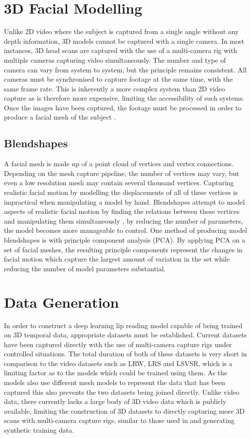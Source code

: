 \documentclass[12pt]{article}
\begin{document}
\section{3D Facial Modelling}
Unlike 2D video where the subject is captured from a single angle without any depth information, 3D models cannot be captured with a single camera.
In most instances, 3D head scans are captured with the use of a multi-camera rig with multiple cameras capturing video simultaneously.
The number and type of camera can vary from system to system, but the principle remains consistent.
All cameras must be synchronised to capture footage at the same time, with the same frame rate.
This is inherently a more complex system than 2D video capture as is therefore more expensive, limiting the accessibility of such systems.  
Once the images have been captured, the footage must be processed in order to produce a facial mesh of the subject \cite{Li2017}.

\subsection{Blendshapes}
A facial mesh is made up of a point cloud of vertices and vertex connections.
Depending on the mesh capture pipeline, the number of vertices may vary, but even a low resolution mesh may contain several thousand vertices.
Capturing realistic facial motion by modelling the displacements of all of these vertices is impractical when manipulating a model by hand.
Blendshapes attempt to model aspects of realistic facial motion by finding the relations between these vertices and manipulating them simultaneously \cite{Lewis2010}, by reducing the number of parameters, the model becomes more manageable to control.
One method of producing model blendshapes is with principle component analysis (PCA).
By applying PCA on a set of facial meshes, the resulting principle components represent the changes in facial motion which capture the largest amount of variation in the set while reducing the number of model parameters substantial.


\section{Data Generation}
In order to construct a deep learning lip reading model capable of being trained on 3D temporal data, appropriate datasets must be established.
Current datasets have been captured directly \cite{Tzirakis2019, Cudeiro2019} with the use of multi-camera capture rigs under controlled situations.
The total duration of both of these datasets is very short in comparison to the video datasets such as LRW, LRS and LSVSR, which is a limiting factor as to the models which could be trained using them.
As the models also use different mesh models to represent the data that has been captured this also prevents the two datasets being joined directly.
Unlike video data, there currently lacks a large body of 3D video data which is publicly available, limiting the construction of 3D datasets to directly capturing more 3D scans with multi-camera capture rigs, similar to those used in \cite{Tzirakis2019, Cudeiro2019} and generating synthetic training data.
\end{document}
